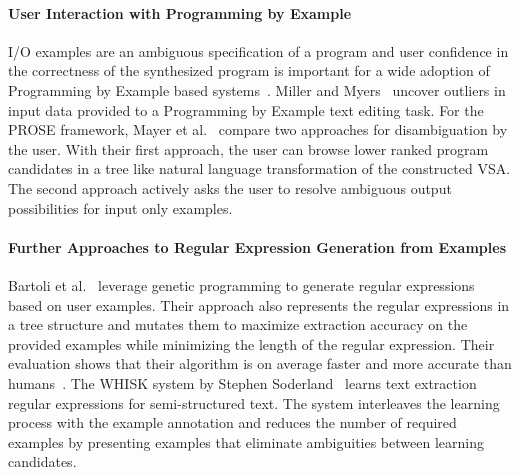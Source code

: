 \documentclass[\myrootdir/main.tex]{subfiles}
\begin{document}
\paragraph{User Interaction with Programming by Example}
I/O examples are an ambiguous specification of a program and user confidence in the correctness of the synthesized program is important for a wide adoption of Programming by Example based systems~\cite{lau2009why-programming-by-demonstration}.
Miller and Myers~\cite{miller2001outlier} uncover outliers in input data provided to a Programming by Example text editing task.
For the PROSE framework, Mayer et al.~\cite{mayer2015user} compare two approaches for disambiguation by the user.
With their first approach, the user can browse lower ranked program candidates in a tree like natural language transformation of the constructed VSA.
The second approach actively asks the user to resolve ambiguous output possibilities for input only examples.


\paragraph{Further Approaches to Regular Expression Generation from Examples}
Bartoli et al.~\cite{bartoli2012automatic} leverage genetic programming to generate regular expressions based on user examples.
Their approach also represents the regular expressions in a tree structure and mutates them to maximize extraction accuracy on the provided examples while minimizing the length of the regular expression.
Their evaluation shows that their algorithm is on average faster and more accurate than humans~\cite{bartoli2016on-the-automatic}.
The WHISK system by Stephen Soderland~\cite{soderland1999learning} learns text extraction regular expressions for semi-structured text.
The system interleaves the learning process with the example annotation and reduces the number of required examples by presenting examples that eliminate ambiguities between learning candidates.
\end{document}
